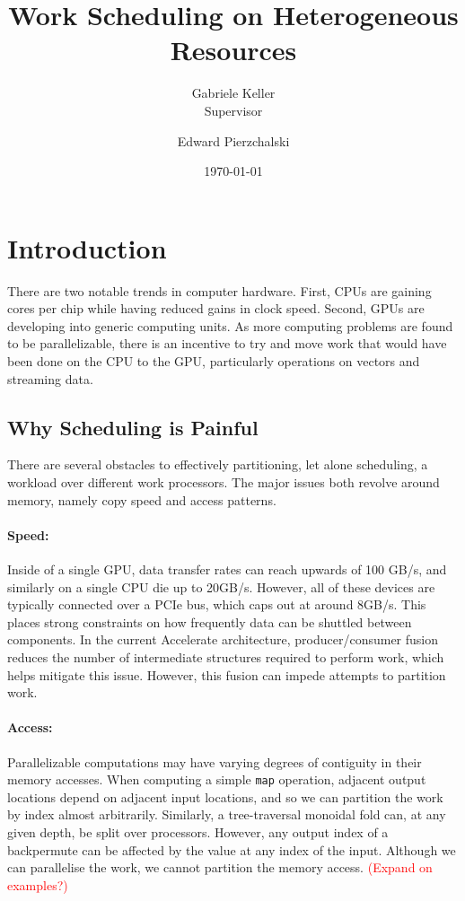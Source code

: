 \documentclass[a4paper,12pt]{article}
\title{Work Scheduling on Heterogeneous Resources}
\date{\today}
\author{Gabriele Keller\\\small{Supervisor} \and Edward Pierzchalski}
\newcommand{\red}[1]{\textcolor{red}{#1}}
\begin{document}
\begin{titlepage}

\cleardoublepage
\maketitle
\thispagestyle{empty}

\end{titlepage}

\section{Introduction}
There are two notable trends in computer hardware. 
First, CPUs are gaining cores per chip while having reduced gains in clock speed. Second, GPUs are developing into generic computing units. 
As more computing problems are found to be parallelizable, there is an incentive to try and move work that would have been done on the CPU to the GPU, particularly operations on vectors and streaming data.

\subsection{Why Scheduling is Painful}
There are several obstacles to effectively partitioning, let alone scheduling, a workload over different work processors. The major issues both revolve around memory, namely copy speed and access patterns. 

\paragraph*{Speed:} Inside of a single GPU, data transfer rates can reach upwards of 100 GB/s, and similarly on a single CPU die up to 20GB/s. However, all of these devices are typically connected over a PCIe bus, which caps out at around 8GB/s. This places strong constraints on how frequently data can be shuttled between components. In the current Accelerate architecture, producer/consumer fusion reduces the number of intermediate structures required to perform work, which helps mitigate this issue. However, this fusion can impede attempts to partition work.

\paragraph*{Access:} Parallelizable computations may have varying degrees of contiguity in their memory accesses. When computing a simple \texttt{map} operation, adjacent output locations depend on adjacent input locations, and so we can partition the work by index almost arbitrarily. Similarly, a tree-traversal monoidal fold can, at any given depth, be split over processors. However, any output index of a backpermute can be affected by the value at any index of the input. Although we can parallelise the work, we cannot partition the memory access. \red{(Expand on examples?)}
\end{document}
